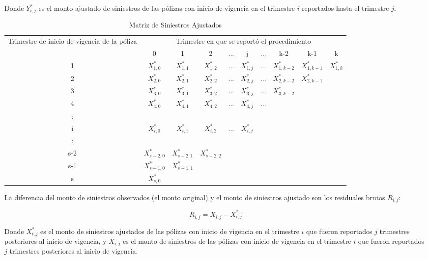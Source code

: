 \documentclass[11pt,twoside,openright,spanish]{report}
\numberwithin{equation}{chapter}
\numberwithin{figure}{chapter}
\numberwithin{table}{chapter}
\begin{document}
	Donde ${Y}_{i,j}^{*}$ es el monto ajustado de siniestros de las pólizas con inicio de vigencia en el trimestre $i$ reportados hasta el trimestre $j$. 
	
	\begin{table}[ht]
		\centering
			\caption{Matriz de Siniestros  Ajustados}
		\begin{tabularx}{\linewidth}{ c|ccccccccc}
		\multirow{2}{4cm}{Trimestre de inicio de vigencia de la póliza}&  \multicolumn{9}{c}{Trimestre en que se reportó el procedimiento} \\
			& 0  & 1 & 2 & $ \dots $ & j & $\dots $ & k-2 & k-1 &  k \\
			\midrule
			1      &  $X_{1,0}^{*}$ & $X_{1,1}^{*}$ & $X_{1,2}^{*}$ & $ \dots $ & $X_{1,j}^{*}$ & $ \dots $ & $X_{1,k-2}^{*}$ & $X_{1,k-1}^{*}$ & $X_{1,k}^{*}$ \\
			2      &  $X_{2,0}^{*}$ & $X_{2,1}^{*}$ & $X_{2,2}^{*}$ & $ \dots $ & $X_{2,j}^{*}$ & $ \dots $ & $X_{2,k-2}^{*}$ & $X_{2,k-1}^{*}$ & \\
			3      &  $X_{3,0}^{*}$ & $X_{3,1}^{*}$ & $X_{3,2}^{*}$ & $ \dots $ & $X_{3,j}^{*}$ & $ \dots $ & $X_{3,k-2}^{*}$ & & \\
			4      &  $X_{4,0}^{*}$ & $X_{4,1}^{*}$ & $X_{4,2}^{*}$ & $ \dots $ & $X_{4,j}^{*}$ & $ \dots $ & & & \\
			:      & & & & & & & & &\\
			i      &  $X_{i,0}^{*}$ & $X_{i,1}^{*}$ & $X_{i,2}^{*}$ & $ \dots $ & $X_{i,j}^{*}$ & & & & \\
			:      & & & & & & & & & \\
			s-2      &  $X_{s-2,0}^{*}$ & $X_{s-2,1}^{*}$ & $X_{s-2,2}^{*}$ & & & & & & \\
			s-1      &  $X_{s-1,0}^{*}$ & $X_{s-1,1}^{*}$ & & & & & & & \\
			s      &  $X_{s,0}^{*}$ & & & & & & & & \\
		\end{tabularx}
	\end{table}
		
	La diferencia del monto de siniestros observados (el monto original) y el monto de siniestros ajustado son los residuales brutos $R_{i,j}^{}$:
		
	\begin{equation}
	R_{i,j}^{}= X_{i,j}^{} - X_{i,j}^{*} 
	\label{eq7}
	\end{equation}
	
	Donde ${X}_{i,j}^{*}$ es el monto de siniestros ajustados de las pólizas con inicio de vigencia en el trimestre $i$ que fueron reportados $j$ trimestres posteriores al inicio de vigencia, y ${X}_{i,j}$ es el monto de siniestros de las pólizas con inicio de vigencia en el trimestre $i$ que fueron reportados $j$ trimestres posteriores al inicio de vigencia.	
	
\end{document}
